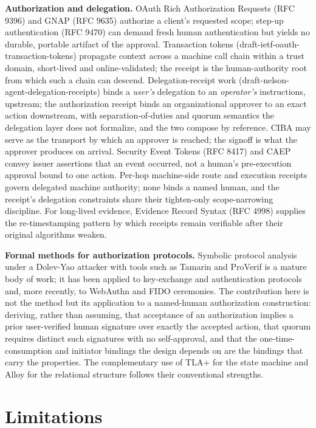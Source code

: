 \documentclass[11pt]{article}
\begin{document}
\textbf{Authorization and delegation.} OAuth Rich Authorization Requests (RFC 9396)
and GNAP (RFC 9635) authorize a client's requested scope; step-up authentication
(RFC 9470) can demand fresh human authentication but yields no durable, portable
artifact of the approval. Transaction tokens (draft-ietf-oauth-transaction-tokens)
propagate context across a machine call chain within a trust domain, short-lived and
online-validated; the receipt is the human-authority root from which such a chain
can descend. Delegation-receipt work (draft-nelson-agent-delegation-receipts) binds
a \emph{user's} delegation to an \emph{operator's} instructions, upstream; the
authorization receipt binds an organizational approver to an exact action
downstream, with separation-of-duties and quorum semantics the delegation layer does
not formalize, and the two compose by reference. CIBA may serve as the transport by
which an approver is reached; the signoff is what the approver produces on arrival.
Security Event Tokens (RFC 8417) and CAEP convey issuer assertions that an event
occurred, not a human's pre-execution approval bound to one action. Per-hop
machine-side route and execution receipts govern delegated machine authority; none
binds a named human, and the receipt's delegation constraints share their
tighten-only scope-narrowing discipline. For long-lived evidence, Evidence Record
Syntax (RFC 4998) supplies the re-timestamping pattern by which receipts remain
verifiable after their original algorithms weaken.

\textbf{Formal methods for authorization protocols.} Symbolic protocol analysis
under a Dolev-Yao attacker with tools such as Tamarin and ProVerif is a mature body
of work; it has been applied to key-exchange and authentication protocols and, more
recently, to WebAuthn and FIDO ceremonies. The contribution here is not the method
but its application to a named-human authorization construction: deriving, rather
than assuming, that acceptance of an authorization implies a prior user-verified
human signature over exactly the accepted action, that quorum requires distinct such
signatures with no self-approval, and that the one-time-consumption and initiator
bindings the design depends on are the bindings that carry the properties. The
complementary use of TLA+ for the state machine and Alloy for the relational
structure follows their conventional strengths.

\section{Limitations}
\end{document}
